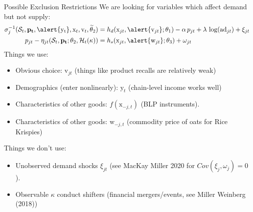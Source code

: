 \documentclass[xcolor=pdftex,dvipsnames,table,mathserif,aspectratio=169]{beamer}
\begin{document}
\begin{frame}{Possible Exclusion Restrictions}
We are looking for variables which affect \alert{demand but not supply}:
\begin{align*}
\sigma_{j}^{-1}(\mathcal{S}_t, \mathbf{p_t},\alert{\mathrm{y_t}}, \mathrm{x}_t,  \mathrm{v}_t, \widetilde{\theta}_2) 
&= h_d(\mathrm{x}_{jt},\alert{ \mathrm{v}_{jt}}; \theta_1) - \alpha\, p_{jt} + \lambda \, \log(\text{ad}_{jt})+ \xi_{jt} \\
p_{jt} - \eta_{jt}(\mathcal{S}_t, \mathbf{p_t}; \theta_2, \mathcal{H}_t(\kappa))
&= h_s(\textrm{x}_{jt}, \alert{\mathrm{w}_{jt}}; \theta_3) + \omega_{jt} 
\end{align*}
Things we use:
\begin{itemize}
    \item Obvious choice: $\mathrm{v}_{jt}$ (things like product recalls are relatively weak)
    \item Demographics (enter nonlinearly): $\mathrm{y}_t$ (chain-level income works well)
    \item Characteristics of other goods: $f(\mathrm{x}_{-j,t})$ (BLP instruments).
    \item Characteristics of other goods: $\mathrm{w}_{-j,t}$ (commodity price of oats for Rice Krispies)
\end{itemize}
\pause
Things we don't use:
\begin{itemize}
    \item Unobserved demand shocks $\xi_{jt}$ (see MacKay Miller 2020 for $Cov(\xi_j,\omega_j)=0$).
    \item Observable $\kappa$ conduct shifters (financial mergers/events, see Miller Weinberg (2018))
\end{itemize}
\end{frame}
\end{document}
